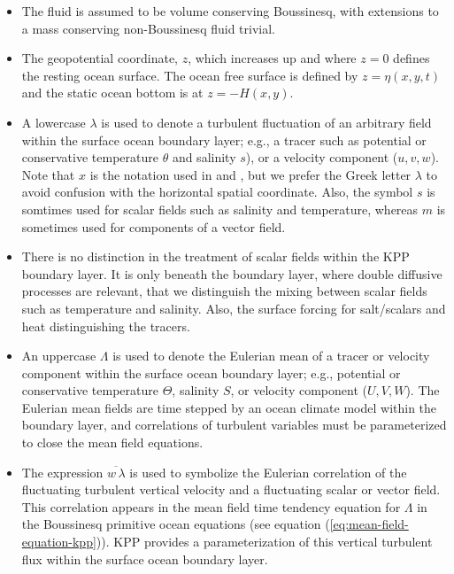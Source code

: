 \begin{itemize}
 
\item The fluid is assumed to be volume conserving Boussinesq, with
  extensions to a mass conserving non-Boussinesq fluid trivial.

\item \label{geopotential_defined} The geopotential coordinate, $z$,
  which increases up and where $z=0$ defines the resting ocean
  surface. The ocean free surface is defined by $z=\eta(x,y,t)$ and
  the static ocean bottom is at $z=-H(x,y)$.

\item \label{lambda_defined} A lowercase $\lambda$ is used to denote a
  turbulent fluctuation of an arbitrary field within the surface ocean
  boundary layer; e.g., a tracer such as potential or conservative
  temperature $\theta$ and salinity $s$), or a velocity component
  ($u,v,w$). Note that $x$ is the notation used in \cite{LargeKPP} and
  \cite{LargeKPP_lectures}, but we prefer the Greek letter $\lambda$
  to avoid confusion with the horizontal spatial coordinate.  Also,
  the symbol $s$ is somtimes used for scalar fields such as salinity
  and temperature, whereas $m$ is sometimes used for components of a
  vector field.  

\item There is no distinction in the treatment of scalar fields within
  the KPP boundary layer.  It is only beneath the boundary layer,
  where double diffusive processes are relevant, that we distinguish
  the mixing between scalar fields such as temperature and salinity.
  Also, the surface forcing for salt/scalars and heat distinguishing
  the tracers.

\item \label{Lambda_defined} An uppercase $\Lambda$ is used to denote
  the Eulerian mean of a tracer or velocity component within the
  surface ocean boundary layer; e.g., potential or conservative
  temperature $\Theta$, salinity $S$, or velocity component ($U,V,W$).
  The Eulerian mean fields are time stepped by an ocean climate model
  within the boundary layer, and correlations of turbulent variables
  must be parameterized to close the mean field equations.

\item \label{correlation_defined} The expression $\overline{w \,
    \lambda}$ is used to symbolize the Eulerian correlation of the
  fluctuating turbulent vertical velocity and a fluctuating scalar or
  vector field. This correlation appears in the mean field time
  tendency equation for $\Lambda$ in the Boussinesq primitive ocean
  equations (see equation (\ref{eq:mean-field-equation-kpp})). KPP
  provides a parameterization of this vertical turbulent flux within
  the surface ocean boundary layer.


\end{itemize}
